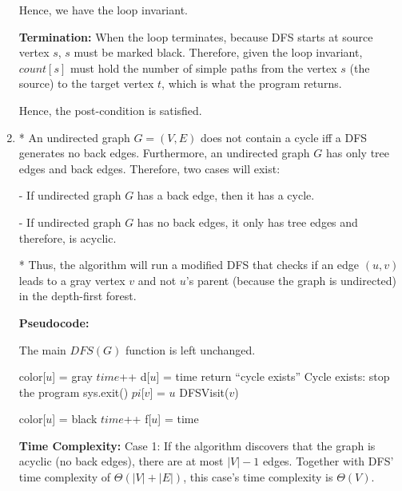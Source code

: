 \documentclass[a4paper]{report}
\begin{document}
\begin{enumerate}
    Hence, we have the loop invariant. 

    {\bf Termination:}
    When the loop terminates, because DFS starts at source vertex $s$, $s$ must be marked black. Therefore, 
    given the loop invariant, $count[s]$ must hold the number of simple paths from the vertex $s$ (the source) to
    the target vertex $t$, which is what the program returns.

    Hence, the post-condition is satisfied.

    \par
    \bigskip

    \item
      *
      An undirected graph $G = (V,E)$ does not contain a cycle iff a DFS generates no back edges. Furthermore, an undirected
      graph $G$ has only tree edges and back edges. Therefore, two cases will exist:

        - If undirected graph $G$ has a back edge, then it has a cycle. 

        - If undirected graph $G$ has no back edges, it only has tree edges and therefore, is acyclic.

      *
      Thus, the algorithm will run a modified DFS that checks if an edge $(u,v)$ leads to a gray vertex $v$ and not 
      $u$'s parent (because the graph is undirected) in the depth-first forest. 

    {\bf Pseudocode:}

    The main $DFS(G)$ function is left unchanged.

    \begin{algorithmic}[1]
      \State color[$u$] = gray
      \State $time$++
      \State d[$u$] = time
          \State return ``cycle exists''
          \Comment Cycle exists: stop the program
          \State sys.exit()
        \EndIf
          \State $pi$[$v$] = $u$
          \State DFSVisit($v$)
        \EndIf
      \EndFor

      \State color[$u$] = black
      \State $time$++
      \State f[$u$] = time
    \EndFunction
    \end{algorithmic}


    {\bf Time Complexity:}
    Case 1: If the algorithm discovers that the graph is acyclic (no back edges), there are at most $|V| - 1$ edges.
    Together with DFS' time complexity of $\Theta(|V| + |E|)$, this case's time complexity is $\Theta(V)$. 


\end{enumerate}
\end{document}
